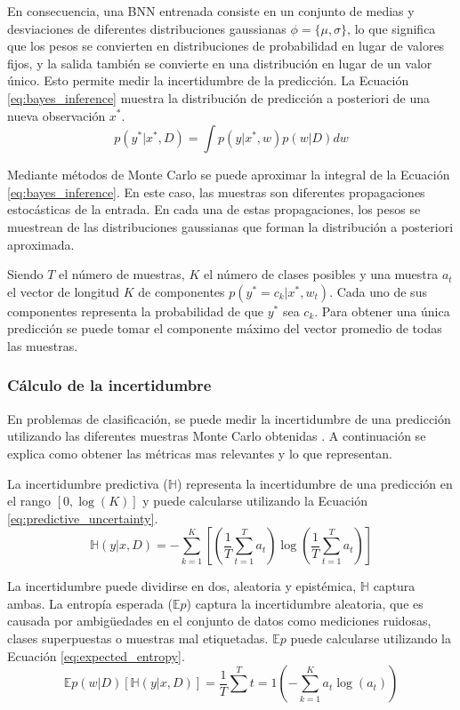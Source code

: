 En consecuencia, una BNN entrenada consiste en un conjunto de medias y desviaciones de diferentes distribuciones gaussianas $\phi = \{\mu, \sigma\}$, lo que significa que los pesos se convierten en distribuciones de probabilidad en lugar de valores fijos, y la salida también se convierte en una distribución en lugar de un valor único. Esto permite medir la incertidumbre de la predicción. La Ecuación \ref{eq:bayes_inference} muestra la distribución de predicción a posteriori de una nueva observación $x^*$.
\begin{equation} \label{eq:bayes_inference}
p(y^*|x^*,D) = \int p(y|x^*,w) p(w|D) dw
\end{equation}

Mediante métodos de Monte Carlo se puede aproximar la integral de la Ecuación \ref{eq:bayes_inference}. En este caso, las muestras son diferentes propagaciones estocásticas de la entrada. En cada una de estas propagaciones, los pesos se muestrean de las distribuciones gaussianas que forman la distribución a posteriori aproximada.

Siendo $T$ el número de muestras, $K$ el número de clases posibles y una muestra $a_t$ el vector de longitud $K$ de componentes $p(y^* = c_k | x^*, w_t)$. Cada uno de sus componentes representa la probabilidad de que $y^*$ sea $c_k$. Para obtener una única predicción se puede tomar el componente máximo del vector promedio de todas las muestras.

\subsubsection{Cálculo de la incertidumbre}

En problemas de clasificación, se puede medir la incertidumbre de una predicción utilizando las diferentes muestras Monte Carlo obtenidas \cite{uncertainty_metrics}. A continuación se explica como obtener las métricas mas relevantes y lo que representan.

La incertidumbre predictiva ($\mathbb{H}$) representa la incertidumbre de una predicción en el rango $[0, \log(K)]$ y puede calcularse utilizando la Ecuación \ref{eq:predictive_uncertainty}.
\begin{equation} \label{eq:predictive_uncertainty}
\mathbb{H}(y|x,D) = - \sum^K_{k=1} \left[ \left( \dfrac{1}{T} \sum^T_{t=1} a_t \right) \log\left( \dfrac{1}{T} \sum^T_{t=1} a_t \right) \right]
\end{equation}

La incertidumbre puede dividirse en dos, aleatoria y epistémica, $\mathbb{H}$ captura ambas. La entropía esperada ($\mathbb{E}p$) captura la incertidumbre aleatoria, que es causada por ambigüedades en el conjunto de datos como mediciones ruidosas, clases superpuestas o muestras mal etiquetadas. $\mathbb{E}p$ puede calcularse utilizando la Ecuación \ref{eq:expected_entropy}.
\begin{equation} \label{eq:expected_entropy}
\mathbb{E}{p(w|D)}[\mathbb{H}(y|x,D)] = \dfrac{1}{T} \sum^T{t=1} \left( -\sum^K_{k=1} a_{t} \log(a_t) \right)
\end{equation}

